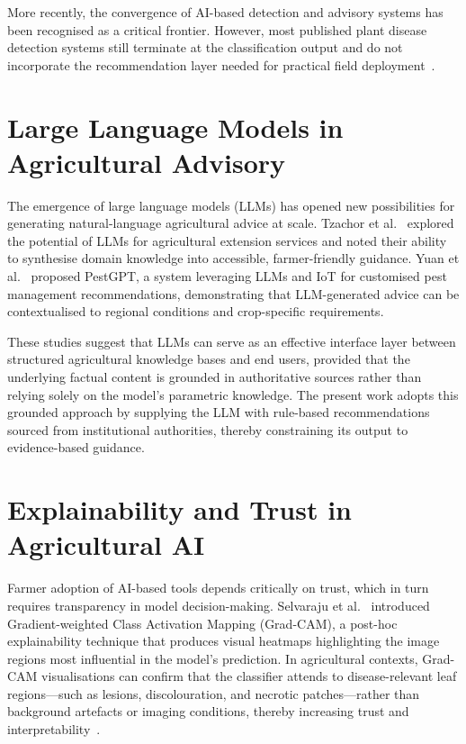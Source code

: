 \documentclass[12pt,a4paper]{report}
\begin{document}
More recently, the convergence of AI-based detection and advisory systems has been recognised as a critical frontier. However, most published plant disease detection systems still terminate at the classification output and do not incorporate the recommendation layer needed for practical field deployment~\cite{b9,b19}.

\section{Large Language Models in Agricultural Advisory}
The emergence of large language models (LLMs) has opened new possibilities for generating natural-language agricultural advice at scale. Tzachor et al.~\cite{b10} explored the potential of LLMs for agricultural extension services and noted their ability to synthesise domain knowledge into accessible, farmer-friendly guidance. Yuan et al.~\cite{b25} proposed PestGPT, a system leveraging LLMs and IoT for customised pest management recommendations, demonstrating that LLM-generated advice can be contextualised to regional conditions and crop-specific requirements.

These studies suggest that LLMs can serve as an effective interface layer between structured agricultural knowledge bases and end users, provided that the underlying factual content is grounded in authoritative sources rather than relying solely on the model's parametric knowledge. The present work adopts this grounded approach by supplying the LLM with rule-based recommendations sourced from institutional authorities, thereby constraining its output to evidence-based guidance.

\section{Explainability and Trust in Agricultural AI}
Farmer adoption of AI-based tools depends critically on trust, which in turn requires transparency in model decision-making. Selvaraju et al.~\cite{b3} introduced Gradient-weighted Class Activation Mapping (Grad-CAM), a post-hoc explainability technique that produces visual heatmaps highlighting the image regions most influential in the model's prediction. In agricultural contexts, Grad-CAM visualisations can confirm that the classifier attends to disease-relevant leaf regions---such as lesions, discolouration, and necrotic patches---rather than background artefacts or imaging conditions, thereby increasing trust and interpretability~\cite{b4,b12}.
\end{document}
